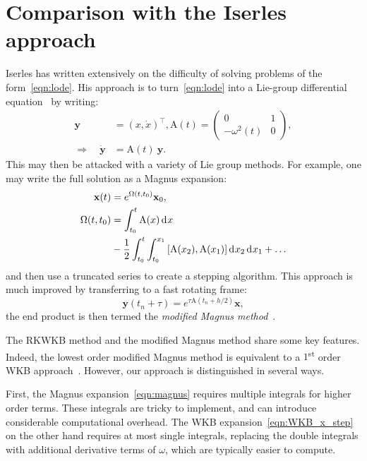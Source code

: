 \section{Comparison with the Iserles approach}
\label{sec:iserles_comparison}
Iserles has written extensively on the difficulty of solving problems of the form~\eqref{eqn:lode}. His approach is to turn~\eqref{eqn:lode} into a Lie-group differential equation~\citep{Iserles00lie-groupmethods} by writing:
\begin{align}
  \mathbf{y} &= {(x,\dot{x})}^\top, 
  \mathrm{A}(t) = 
  \left(
  \begin{array}{cc}
    0 & 1 \\
    -\omega^2(t) & 0
  \end{array}
  \right),
  \nonumber\\
  \Rightarrow\quad 
  \dot{\mathbf{y}} &= \mathrm{A} (t) \: \mathbf{y}.\label{eqn:lie_eqn}
\end{align}
This may then be attacked with a variety of Lie group methods. For example, one may write the full solution as a Magnus expansion:
\begin{align}
  \mathbf{x}(t) &= e^{\Omega(t,t_0)} \mathbf{x}_0,
  \label{eqn:magnus}\\
  \Omega(t,t_0) &= \int_{t_0}^t \mathrm{A}(x) \operatorname{d}^{}\!{x} \nonumber \\
  &- \frac{1}{2}\int_{t_0}^t\int_{t_0}^{x_1} \left[\mathrm{A}(x_2),\mathrm{A}(x_1)\right] \operatorname{d}^{}\!{x_2} \operatorname{d}^{}\!{x_1} + \ldots
  \nonumber
\end{align}
and then use a truncated series to create a stepping algorithm.
This approach is much improved by transferring to a fast rotating frame:
\begin{equation}
  \mathbf{y}(t_n+\tau) = e^{\tau \mathrm{A}(t_n+h/2)} \mathbf{x},
  \label{eqn:rotating_frame}
\end{equation}
the end product is then termed the {\em modified Magnus method\/}~\citep{Iserles01thinkglobally}.

The RKWKB method and the modified Magnus method share some key features. Indeed, the lowest order modified Magnus method is equivalent to a \(1\)\textsuperscript{st} order WKB approach~\citep{Iserles02globalerror}. However, our approach is distinguished in several ways. 

First, the Magnus expansion~\eqref{eqn:magnus} requires multiple integrals for higher order terms. These integrals are tricky to implement, and can introduce considerable computational overhead. The WKB expansion~\eqref{eqn:WKB_x_step} on the other hand requires at most single integrals, replacing the double integrals with additional derivative terms of \(\omega\), which are typically easier to compute.

